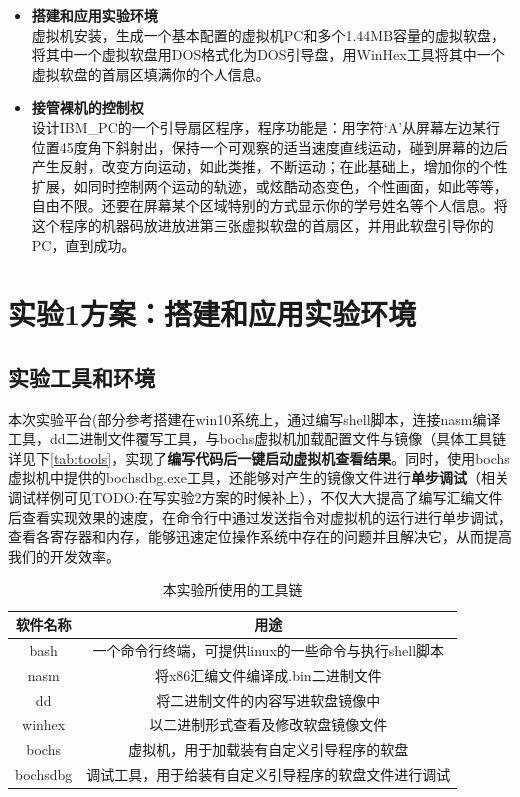\documentclass[forprint]{WHUBachelor}
\begin{document}
\begin{itemize}
  \item \textbf{搭建和应用实验环境} \\
  虚拟机安装，生成一个基本配置的虚拟机PC和多个1.44MB容量的虚拟软盘，将其中一个虚拟软盘用DOS格式化为DOS引导盘，用WinHex工具将其中一个虚拟软盘的首扇区填满你的个人信息。
  \item \textbf{接管裸机的控制权} \\
  设计IBM\_PC的一个引导扇区程序，程序功能是：用字符‘A’从屏幕左边某行位置45度角下斜射出，保持一个可观察的适当速度直线运动，碰到屏幕的边后产生反射，改变方向运动，如此类推，不断运动；在此基础上，增加你的个性扩展，如同时控制两个运动的轨迹，或炫酷动态变色，个性画面，如此等等，自由不限。还要在屏幕某个区域特别的方式显示你的学号姓名等个人信息。将这个程序的机器码放进放进第三张虚拟软盘的首扇区，并用此软盘引导你的PC，直到成功。
\end{itemize}

\chapter{实验1方案：搭建和应用实验环境}


\section{实验工具和环境}

本次实验平台(部分参考\cite{于渊2009orange}搭建在win10系统上，通过编写shell脚本，连接nasm编译工具，dd二进制文件覆写工具，与bochs虚拟机加载配置文件与镜像（具体工具链详见下\autoref{tab:tools}，实现了\textbf{编写代码后一键启动虚拟机查看结果}。同时，使用bochs虚拟机中提供的bochsdbg.exe工具，还能够对产生的镜像文件进行\textbf{单步调试}（相关调试样例可见TODO:在写实验2方案的时候补上），不仅大大提高了编写汇编文件后查看实现效果的速度，在命令行中通过发送指令对虚拟机的运行进行单步调试，查看各寄存器和内存，能够迅速定位操作系统中存在的问题并且解决它，从而提高我们的开发效率。

\begin{table}[htp]
  \caption{本实验所使用的工具链}
  \centering
  \begin{tabular}{cc}
    \toprule
    软件名称 & 用途  \\
    \midrule
    bash & 一个命令行终端，可提供linux的一些命令与执行shell脚本 \\
    nasm & 将x86汇编文件编译成.bin二进制文件 \\
    dd & 将二进制文件的内容写进软盘镜像中  \\
    winhex & 以二进制形式查看及修改软盘镜像文件 \\
    bochs & 虚拟机，用于加载装有自定义引导程序的软盘  \\
    bochsdbg & 调试工具，用于给装有自定义引导程序的软盘文件进行调试 \\
    \bottomrule
  \end{tabular}
  \label{tab:tools}
\end{table}
\end{document}
